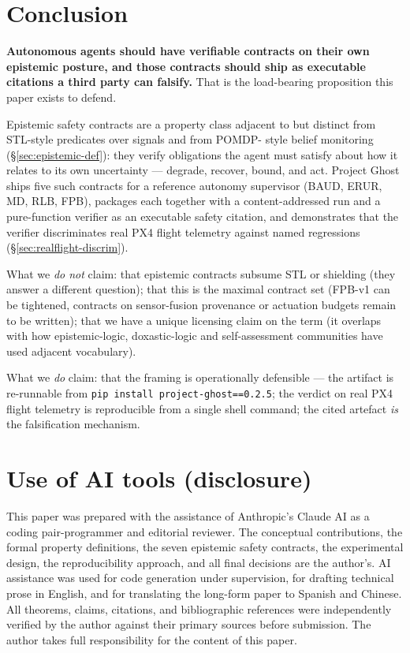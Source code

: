 \documentclass[acmsmall,nonacm=true,review=false]{acmart}
\theoremstyle{plain}
\begin{document}
\section{Conclusion}
\textbf{Autonomous agents should have verifiable contracts on
their own epistemic posture, and those contracts should ship as
executable citations a third party can falsify.} That is the
load-bearing proposition this paper exists to defend.

Epistemic safety contracts are a property class adjacent to but
distinct from STL-style predicates over signals and from POMDP-
style belief monitoring (\S\ref{sec:epistemic-def}): they verify
obligations the agent must satisfy about how it relates to its
own uncertainty --- degrade, recover, bound, and act. Project
Ghost ships five such contracts for a reference autonomy
supervisor (BAUD, ERUR, MD, RLB, FPB), packages each together
with a content-addressed run and a pure-function verifier as an
executable safety citation, and demonstrates that the verifier
discriminates real PX4 flight telemetry against named regressions
(\S\ref{sec:realflight-discrim}).

What we \emph{do not} claim: that epistemic contracts subsume STL
or shielding (they answer a different question); that this is
the maximal contract set (FPB-v1 can be tightened, contracts on
sensor-fusion provenance or actuation budgets remain to be
written); that we have a unique licensing claim on the term
(it overlaps with how epistemic-logic, doxastic-logic and
self-assessment communities have used adjacent vocabulary).

What we \emph{do} claim: that the framing is operationally
defensible --- the artifact is re-runnable from
\texttt{pip install project-ghost==0.2.5}; the verdict on real
PX4 flight telemetry is reproducible from a single shell command;
the cited artefact \emph{is} the falsification mechanism.

\section*{Use of AI tools (disclosure)}

This paper was prepared with the assistance of Anthropic's Claude
AI as a coding pair-programmer and editorial reviewer. The
conceptual contributions, the formal property definitions, the
seven epistemic safety contracts, the experimental design, the
reproducibility approach, and all final decisions are the
author's. AI assistance was used for code generation under
supervision, for drafting technical prose in English, and for
translating the long-form paper to Spanish and Chinese. All
theorems, claims, citations, and bibliographic references were
independently verified by the author against their primary
sources before submission. The author takes full responsibility
for the content of this paper.



\end{document}
